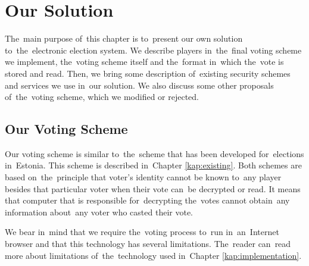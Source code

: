 \chapter{Our Solution}
\label{kap:solution}
The~main purpose of~this chapter is to~present our own solution to~the~electronic election system. We describe players in~the~final voting scheme we implement, the~voting scheme itself and the~format in~which the~vote is stored and read. Then, we bring some description of~existing security schemes and services we use in~our solution. We also discuss some other proposals of~the~voting scheme, which we modified or rejected. 

\section{Our Voting Scheme}
Our voting scheme is similar to~the~scheme that has been developed for~elections in~Estonia. This scheme is described in~Chapter \ref{kap:existing}. Both schemes are based on~the~principle that voter's identity cannot be known to~any player besides that particular voter when their vote can~be decrypted or read. It means that computer that is responsible for~decrypting the~votes cannot obtain~any information about~any voter who casted their vote. 

We bear in~mind that we require the~voting process to~run in~an~Internet browser and that this technology has several limitations. The~reader can~read more about limitations of~the~technology used in~Chapter \ref{kap:implementation}.

